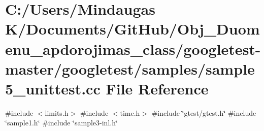 \hypertarget{googletest-master_2googletest_2samples_2sample5__unittest_8cc}{}\section{C\+:/\+Users/\+Mindaugas K/\+Documents/\+Git\+Hub/\+Obj\+\_\+\+Duomenu\+\_\+apdorojimas\+\_\+class/googletest-\/master/googletest/samples/sample5\+\_\+unittest.cc File Reference}
\label{googletest-master_2googletest_2samples_2sample5__unittest_8cc}
{\ttfamily \#include $<$limits.\+h$>$}\newline
{\ttfamily \#include $<$time.\+h$>$}\newline
{\ttfamily \#include \char`\"{}gtest/gtest.\+h\char`\"{}}\newline
{\ttfamily \#include \char`\"{}sample1.\+h\char`\"{}}\newline
{\ttfamily \#include \char`\"{}sample3-\/inl.\+h\char`\"{}}\newline
